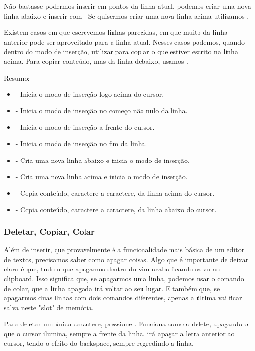 \documentclass[a4paper, 12pt]{article}
\begin{document}
Não bastasse podermos inserir em pontos da linha atual, podemos criar uma nova linha abaixo e inserir com .
Se quisermos criar uma nova linha acima utilizamos .

Existem casos em que escrevemos linhas parecidas, em que muito da linha anterior pode ser aproveitado para a linha atual.
Nesses casos podemos, quando dentro do modo de inserção, utilizar  para copiar o que estiver escrito
na linha acima. Para copiar conteúdo, mas da linha debaixo, usamos .

Resumo:
\begin{itemize}
    \item {} - Inicia o modo de inserção logo acima do cursor.
    \item {} - Inicia o modo de inserção no começo não nulo da linha.
    \item {} - Inicia o modo de inserção a frente do cursor.
    \item {} - Inicia o modo de inserção no fim da linha.
    \item {} - Cria uma nova linha abaixo e inicia o modo de inserção.
    \item {} - Cria uma nova linha acima e inicia o modo de inserção.
    \item {} - Copia conteúdo, caractere a caractere, da linha acima do cursor.
    \item {} - Copia conteúdo, caractere a caractere, da linha abaixo do cursor.
\end{itemize}

\subsubsection{Deletar, Copiar, Colar}
Além de inserir, que provavelmente é a funcionalidade mais básica de um editor de textos, precisamos saber como apagar coisas.
Algo que é importante de deixar claro é que, tudo o que apagamos dentro do vim acaba ficando salvo no clipboard.
Isso significa que, se apagarmos uma linha, podemos usar o comando de colar, que a linha apagada irá voltar ao seu lugar.
E também que, se apagarmos duas linhas com dois comandos diferentes, apenas a última vai ficar salva neste "slot" de memória.

Para deletar um único caractere, pressione .
Funciona como o delete, apagando o que o cursor ilumina, sempre a frente da linha.
 irá apagar a letra anterior ao cursor, tendo o efeito do backspace, sempre regredindo a linha.
\end{document}
